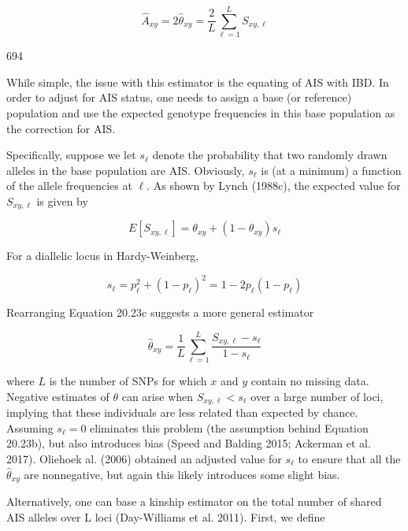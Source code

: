 \documentclass{article}
\begin{document}
\begin{equation}
\widehat{A}_{x y}=2\widehat{\theta}_{x y}=\frac{2}{L}\sum_{\ell=1}^{L}S_{x y,\ell}
\tag{20.23b}
\label{eq:20_23b}
\end{equation}

694

While simple, the issue with this estimator is the equating of AIS with IBD. In order to adjust for AIS status, one needs to assign a base (or reference) population and use the expected genotype frequencies in this base population as the correction for AIS.

Specifically, suppose we let  $ s_\ell $ denote the probability that two randomly drawn alleles in the base population are AIS. Obviously,  $ s_\ell $ is (at a minimum) a function of the allele frequencies at  $ \ell $. As shown by Lynch (1988c), the expected value for  $ S_{xy,\ell} $ is given by

\begin{equation}
E[S_{x y,\ell}]=\theta_{x y}+(1-\theta_{x y})s_{\ell}
\tag{20.23c}
\label{eq:20_23c}
\end{equation}

For a diallelic locus in Hardy-Weinberg,

\begin{equation}
s_{\ell}=p_{\ell}^{2}+\left(1-p_{\ell}\right)^{2}=1-2p_{\ell}(1-p_{\ell})
\end{equation}

Rearranging Equation 20.23c suggests a more general estimator

\begin{equation}
\widehat{\theta}_{xy}=\frac{1}{L}\sum_{\ell=1}^{L}\frac{S_{xy,\ell}-s_{\ell}}{1-s_{\ell}}
\tag{20.23d}
\label{eq:20_23d}
\end{equation}

where $L$ is the number of SNPs for which $x$ and $y$ contain no missing data. Negative estimates of $\theta$ can arise when $S_{xy,\ell} < s_\ell$ over a large number of loci, implying that these individuals are less related than expected by chance. Assuming $s_\ell = 0$ eliminates this problem (the assumption behind Equation 20.23b), but also introduces bias (Speed and Balding 2015; Ackerman et al. 2017). Oliehoek al. (2006) obtained an adjusted value for $s_\ell$ to ensure that all the $\widehat{\theta}_{xy}$ are nonnegative, but again this likely introduces some slight bias.

Alternatively, one can base a kinship estimator on the total number of shared AIS alleles over L loci (Day-Williams et al. 2011). First, we define
\end{document}
